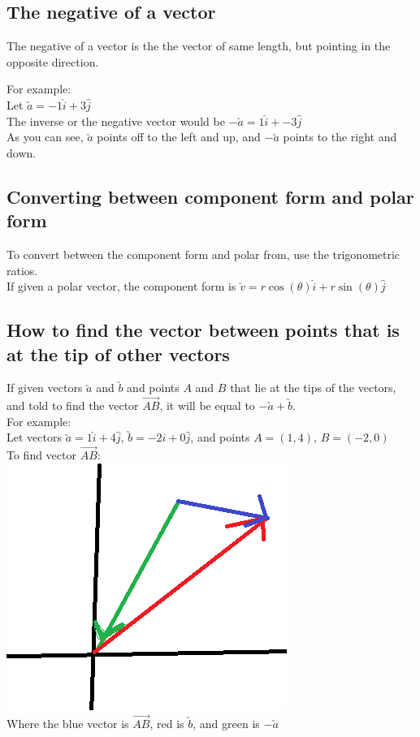 \documentclass[a4paper,10pt]{report}
\newenvironment{example}{For example:\\}{}
\begin{document}
\subsection{The negative of a vector}
The negative of a vector is the the vector of same length, but pointing in the opposite direction.

\begin{example}
	Let $\utilde{a} = -1\hat{i} + 3\hat{j}$\\
	The inverse or the negative vector would be $-\utilde{a} = 1\hat{i} + -3\hat{j}$\\
	As you can see, $\utilde{a}$ points off to the left and up, and $-\utilde{a}$ points to the right and down.
\end{example}

\subsection{Converting between component form and polar form}
To convert between the component form and polar from, use the trigonometric ratios.\\
If given a polar vector, the component form is $\utilde{v} = r\cos(\theta)\hat{i} + r\sin(\theta)\hat{j}$

\subsection{How to find the vector between points that is at the tip of other vectors}
If given vectors $\utilde{a}$ and $\utilde{b}$ and points $A$ and $B$ that lie at the tips of the vectors, and told to find the vector $\Vec{AB}$, it will be equal to $-\utilde{a} + \utilde{b}$.\\
\begin{example}
	Let vectors $\utilde{a} = 1\hat{i} + 4\hat{j}$, $\utilde{b} = -2\hat{i} + 0\hat{j}$, and points $A = (1, 4)$, $B = (-2, 0)$\\
	To find vector $\Vec{AB}$:\\
	\includegraphics[scale=0.5]{VecAB}\\
	Where the blue vector is $\Vec{AB}$, red is $\utilde{b}$, and green is $-\utilde{a}$
\end{example}
\end{document}
